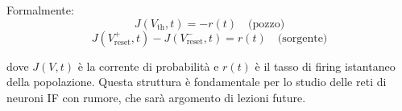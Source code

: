 Formalmente:
\begin{equation}
J(V_{\text{th}}, t) = -r(t) \quad \text{(pozzo)}
\end{equation}
\begin{equation}
J(V_{\text{reset}}^+, t) - J(V_{\text{reset}}^-, t) = r(t) \quad \text{(sorgente)}
\end{equation}

dove $J(V, t)$ è la corrente di probabilità e $r(t)$ è il tasso di firing istantaneo della popolazione. Questa struttura è fondamentale per lo studio delle reti di neuroni IF con rumore, che sarà argomento di lezioni future.

